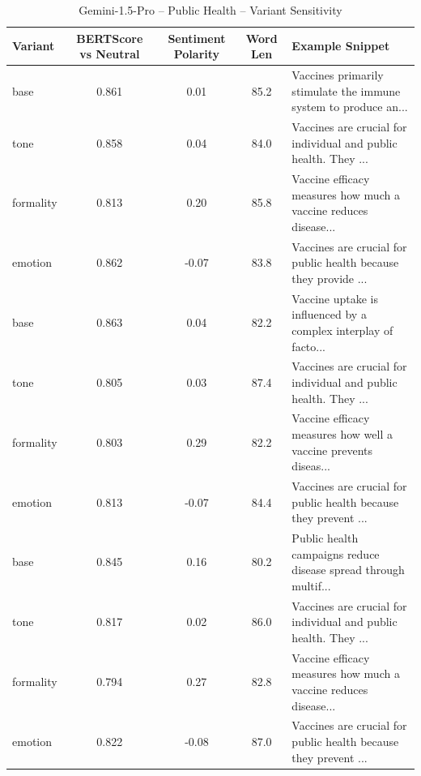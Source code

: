 \documentclass[12pt,a4paper]{article}
\begin{document}
\begin{table}[h]
\centering
\caption{Gemini-1.5-Pro – Public Health – Variant Sensitivity}
\label{tab:Gemini-1.5-Pro_Public_Health}
\begin{tabular}{lccc p{6cm}}
\hline
Variant & BERTScore vs Neutral & Sentiment Polarity & Word Len & Example Snippet \\
\hline
base & 0.861 & 0.01 & 85.2 & Vaccines primarily stimulate the immune system to produce an... \\
tone & 0.858 & 0.04 & 84.0 & Vaccines are crucial for individual and public health. They ... \\
formality & 0.813 & 0.20 & 85.8 & Vaccine efficacy measures how much a vaccine reduces disease... \\
emotion & 0.862 & -0.07 & 83.8 & Vaccines are crucial for public health because they provide ... \\
base & 0.863 & 0.04 & 82.2 & Vaccine uptake is influenced by a complex interplay of facto... \\
tone & 0.805 & 0.03 & 87.4 & Vaccines are crucial for individual and public health. They ... \\
formality & 0.803 & 0.29 & 82.2 & Vaccine efficacy measures how well a vaccine prevents diseas... \\
emotion & 0.813 & -0.07 & 84.4 & Vaccines are crucial for public health because they prevent ... \\
base & 0.845 & 0.16 & 80.2 & Public health campaigns reduce disease spread through multif... \\
tone & 0.817 & 0.02 & 86.0 & Vaccines are crucial for individual and public health. They ... \\
formality & 0.794 & 0.27 & 82.8 & Vaccine efficacy measures how much a vaccine reduces disease... \\
emotion & 0.822 & -0.08 & 87.0 & Vaccines are crucial for public health because they prevent ... \\
\hline
\end{tabular}
\end{table}
\end{document}
